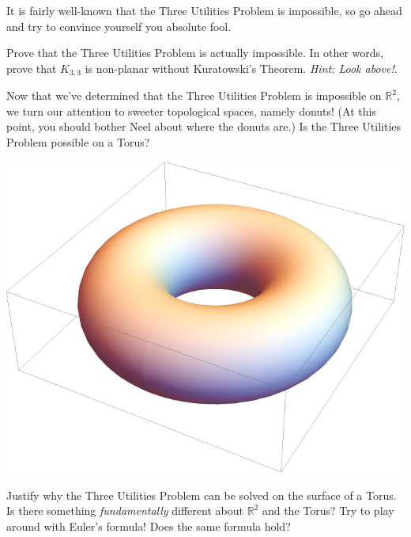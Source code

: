 \documentclass{article}
\begin{document}
\begin{exercise}
It is fairly well-known that the Three Utilities Problem is impossible, so go ahead and try to convince yourself you absolute fool.
\end{exercise} 
\begin{exercise}
Prove that the Three Utilities Problem is actually impossible. In other words, prove that $K_{3,3}$ is non-planar without Kuratowski's Theorem. \emph{Hint: Look above!}.
\end{exercise}
\begin{exercise} 
Now that we've determined that the Three Utilities Problem is impossible on $\mathbb{R}^2$, we turn our attention to sweeter topological spaces, namely donuts! 
(At this point, you should bother Neel about where the donuts are.) Is the Three Utilities Problem possible on a Torus?
\begin{center} 
    \includegraphics[scale=0.3]{Pics/yum.png}
\end{center}
\end{exercise}
\begin{exercise} 
Justify why the Three Utilities Problem can be solved on the surface of a Torus. Is there something \emph{fundamentally} different about
$\mathbb{R}^2$ and the Torus? Try to play around with Euler's formula! Does the same formula hold?
\end{exercise}
\end{document}
